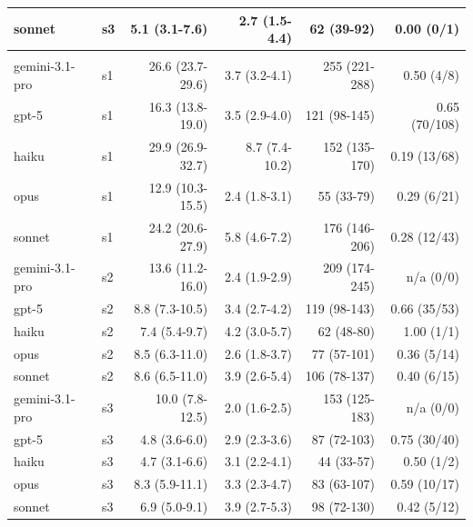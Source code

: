 \documentclass[10pt]{article} %
\begin{document}
\begin{table}[h]
\begin{center}
\begin{tabular}{llrrrr}
        sonnet         & s3 & 5.1 (3.1-7.6)    & 2.7 (1.5-4.4)  & 62 (39-92)    & 0.00 (0/1) \\
        \hline \\
        gemini-3.1-pro & s1 & 26.6 (23.7-29.6) & 3.7 (3.2-4.1)  & 255 (221-288) & 0.50 (4/8) \\
        gpt-5          & s1 & 16.3 (13.8-19.0) & 3.5 (2.9-4.0)  & 121 (98-145)  & 0.65 (70/108) \\
        haiku          & s1 & 29.9 (26.9-32.7) & 8.7 (7.4-10.2) & 152 (135-170) & 0.19 (13/68) \\
        opus           & s1 & 12.9 (10.3-15.5) & 2.4 (1.8-3.1)  & 55 (33-79)    & 0.29 (6/21) \\
        sonnet         & s1 & 24.2 (20.6-27.9) & 5.8 (4.6-7.2)  & 176 (146-206) & 0.28 (12/43) \\
        gemini-3.1-pro & s2 & 13.6 (11.2-16.0) & 2.4 (1.9-2.9)  & 209 (174-245) & n/a (0/0) \\
        gpt-5          & s2 & 8.8 (7.3-10.5)   & 3.4 (2.7-4.2)  & 119 (98-143)  & 0.66 (35/53) \\
        haiku          & s2 & 7.4 (5.4-9.7)    & 4.2 (3.0-5.7)  & 62 (48-80)    & 1.00 (1/1) \\
        opus           & s2 & 8.5 (6.3-11.0)   & 2.6 (1.8-3.7)  & 77 (57-101)   & 0.36 (5/14) \\
        sonnet         & s2 & 8.6 (6.5-11.0)   & 3.9 (2.6-5.4)  & 106 (78-137)  & 0.40 (6/15) \\
        gemini-3.1-pro & s3 & 10.0 (7.8-12.5)  & 2.0 (1.6-2.5)  & 153 (125-183) & n/a (0/0) \\
        gpt-5          & s3 & 4.8 (3.6-6.0)    & 2.9 (2.3-3.6)  & 87 (72-103)   & 0.75 (30/40) \\
        haiku          & s3 & 4.7 (3.1-6.6)    & 3.1 (2.2-4.1)  & 44 (33-57)    & 0.50 (1/2) \\
        opus           & s3 & 8.3 (5.9-11.1)   & 3.3 (2.3-4.7)  & 83 (63-107)   & 0.59 (10/17) \\
        sonnet         & s3 & 6.9 (5.0-9.1)    & 3.9 (2.7-5.3)  & 98 (72-130)   & 0.42 (5/12) \\
    \end{tabular}
    \end{center}
    \end{table}

\FloatBarrier
\end{document}
